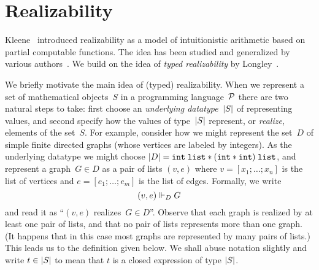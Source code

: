 
\section{Realizability}
\label{sec:realizability}

Kleene~\cite{KleeneSC:intint} introduced realizability as a model of
intuitionistic arithmetic based on partial computable functions. The
idea has been studied and generalized by various
authors~\cite{TroelstraA:rea,HylandJ:efft,HylandJ:trit,OostenJ:exer}.
We build on the idea of \emph{typed realizability} by
Longley~\cite{Longley00}.

We briefly motivate the main idea of (typed) realizability. When we
represent a set of mathematical objects~$S$ in a programming
language~$\mathcal{P}$ there are two natural steps to take: first choose an
\emph{underlying datatype~$|S|$} of representing values, and second
specify how the values of type~$|S|$ represent, or \emph{realize},
elements of the set~$S$. For example, consider how we might represent
the set~$D$ of simple finite directed graphs (whose vertices are
labeled by integers). As the underlying datatype we might choose
$|D| = \mathtt{int} \; \mathtt{list} * (\mathtt{int} *
\mathtt{int}) \; \mathtt{list}$, and represent a graph~$G \in D$ as a
pair of lists $(v,e)$ where $v = [x_1; \ldots; x_n]$ is the list of
vertices and $e = [e_1; \ldots; e_m]$ is the list of edges. Formally,
we write
%
\begin{equation*}
  (v, e) \Vdash_D G
\end{equation*}
%
and read it as ``$(v,e)$ realizes~$G \in D$''. Observe that each graph
is realized by at least one pair of lists, and that no pair of lists
represents more than one graph. (It happens that in this case most graphs are
represented by many pairs of lists.) This leads us to the definition given
below. We shall abuse notation slightly and write $t \in |S|$ to
mean that $t$ is a closed expression of type $|S|$.


